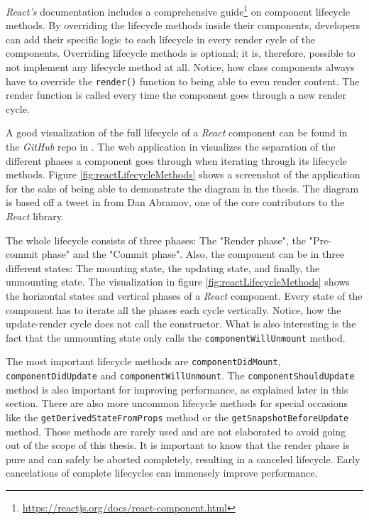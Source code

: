 \emph{React's} documentation includes a comprehensive guide\footnote{\url{https://reactjs.org/docs/react-component.html}} on component lifecycle methods. By overriding the lifecycle methods inside their components, developers can add their specific logic to each lifecycle in every render cycle of the components. Overriding lifecycle methods is optional; it is, therefore, possible to not implement any lifecycle method at all. Notice, how class components always have to override the \texttt{render()} function to being able to even render content. The render function is called every time the component goes through a new render cycle.

A good visualization of the full lifecycle of a \emph{React} component can be found in the \emph{GitHub} repo in \cite{ReactRenderCycleGithub}. The web application in \cite{ReactRenderCycleDiagram} visualizes the separation of the different phases a component goes through when iterating through its lifecycle methods. Figure \ref{fig:reactLifecycleMethods} shows a screenshot of the application for the sake of being able to demonstrate the diagram in the thesis. The diagram is based off a tweet in \cite{ReactCycleTweet} from Dan Abramov, one of the core contributors to the \emph{React} library.

The whole lifecycle consists of three phases: The "Render phase", the "Pre-commit phase" and the "Commit phase". Also, the component can be in three different states: The mounting state, the updating state, and finally, the unmounting state. The visualization in figure \ref{fig:reactLifecycleMethods} shows the horizontal states and vertical phases of a \emph{React} component. Every state of the component has to iterate all the phases each cycle vertically. Notice, how the update-render cycle does not call the constructor. What is also interesting is the fact that the unmounting state only calls the \texttt{componentWillUnmount} method.

The most important lifecycle methods are \texttt{component\-Did\-Mount}, \texttt{component\-Did\-Update} and \texttt{component\-Will\-Unmount}. The \texttt{componentShouldUpdate} method is also important for improving performance, as explained later in this section. There are also more uncommon lifecycle methods for special occasions like the \texttt{getDerivedStateFromProps} method or the \texttt{getSnapshotBeforeUpdate} method. Those methods are rarely used and are not elaborated to avoid going out of the scope of this thesis. It is important to know that the render phase is pure and can safely be aborted completely, resulting in a canceled lifecycle. Early cancelations of complete lifecycles can immensely improve performance.

